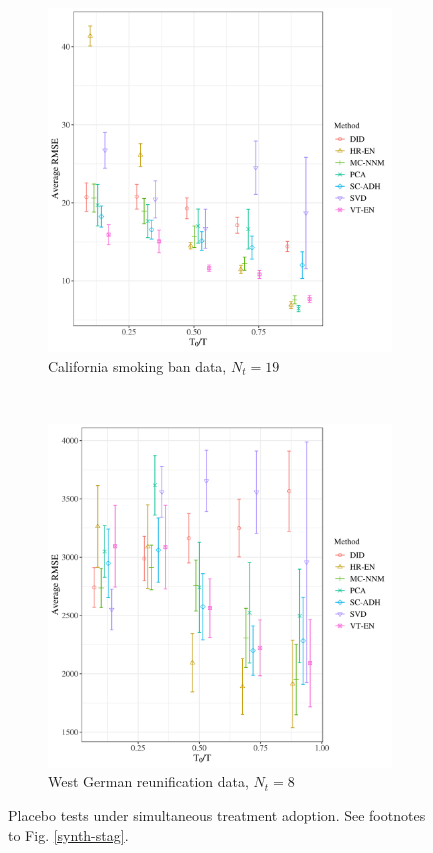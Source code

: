 \documentclass[12pt]{article}
\begin{document}
\begin{figure}[htbp]
\begin{subfigure}[t]{0.45\textwidth}
		\includegraphics[width=\textwidth]{plots/california_N_38_T_31_numruns_20_num_treated_19_simultaneuous_1.png}
		\caption{California smoking ban data, $N_t = 19$}
	\end{subfigure}
	~
	\begin{subfigure}[t]{0.45\textwidth}
		\centering
		\includegraphics[width=\textwidth]{plots/germany_N_16_T_44_numruns_20_num_treated_8_simultaneuous_1.png}
		\caption{West German reunification data, $N_t = 8$} 
	\end{subfigure}
	\caption{Placebo tests under simultaneous treatment adoption. See footnotes to Fig. \ref{synth-stag}. \label{synth-sim}} 
\end{figure}
\end{document}
